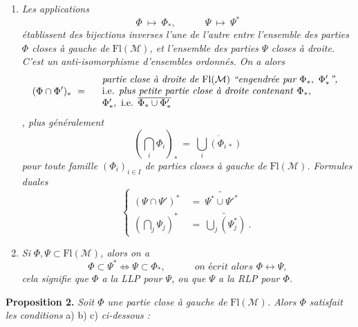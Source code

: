 \documentclass[11pt]{article}
\newcommand{\printedpage}[1]{\marginpar{\footnotesize p.~#1}}
\newcommand{\msp}[1]{\marginpar{\footnotesize [#1]}}
\newcommand{\Fl}{\mathrm{Fl}}
\newcommand{\M}{\mathcal{M}}
\begin{document}
\begin{enumerate}[label={}]
\item[c)] \textit{Les applications}
\[
\Phi \ \longmapsto\ \Phi_*, \qquad\quad \Psi\ \longmapsto\ \Psi^*
\]
\textit{établissent des bijections inverses l'une de l'autre entre l'ensemble des parties $\Phi$ closes à gauche de} $\Fl(\M)$\textit{, et l'ensemble des parties $\Psi$ closes à droite. C'est un anti-isomorphisme d'ensembles ordonnés. On a alors}
\[
(\Phi \cap \Phi')_* \ = \quad
\begin{array}{l}
\textit{partie close à droite de } \Fl(\M) \ \textit{``engendrée par } \Phi_*,\ \Phi'_*\textit{'',} \\
\text{i.e. \textit{plus petite partie close à droite contenant} } \Phi_*, \\
\Phi'_*, \text{ i.e. } \overline{\Phi_* \cup \Phi'_*}
\end{array}
\]
\textit{, plus généralement}
\[
(\bigcap_i \Phi_i)_* \ = \ \overline{\bigcup_i (\Phi_{i\,*})}
\]
\textit{pour toute famille $(\Phi_i)_{i \in I}$ de parties closes à gauche de} $\Fl(\M)$\textit{. Formules duales}
\[
\left\{
\begin{aligned}
(\Psi \cap \Psi')^* \ &= \ \widetilde{\Psi^* \cup \Psi'^*} \\
(\bigcap_j \Psi_j)^* \ &= \ \widetilde{\bigcup_j (\Psi_j^*)}\ .
\end{aligned}
\right.
\]

\item[d)] \textit{Si} $\Phi, \Psi \subset \Fl(\M)$\textit{, alors on a}
\[
\Phi \subset \Psi^* \iff \Psi \subset \Phi_*, \qquad\quad \textit{on écrit alors } \Phi \longleftrightarrow \Psi,
\]
\textit{cela signifie que $\Phi$ a la LLP pour $\Psi$, ou que $\Psi$ a la RLP pour $\Phi$.}
\end{enumerate}

\printedpage{3}

\msp{page 4}

\noindent\textbf{Proposition 2.} \textit{Soit $\Phi$ une partie close à gauche de} $\Fl(\M)$\textit{. Alors $\Phi$ satisfait les conditions} a) b) c) \textit{ci-dessous :}
\end{document}
